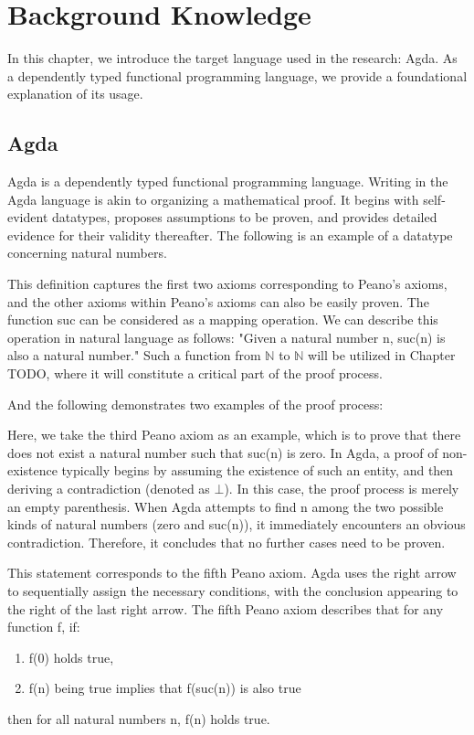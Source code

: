 \chapter{Background Knowledge}
\label{chapter:doccls}

In this chapter, we introduce the target language used in the research: Agda. 
As a dependently typed functional programming language, we provide a foundational explanation of its usage.

\section{Agda}

Agda is a dependently typed functional programming language.
Writing in the Agda language is akin to organizing a mathematical proof. It begins with self-evident datatypes, proposes assumptions to be proven, and provides detailed evidence for their validity thereafter.
The following is an example of a datatype concerning natural numbers.



This definition captures the first two axioms corresponding to Peano's axioms, and the other axioms within Peano's axioms can also be easily proven. 
The function suc can be considered as a mapping operation. 
We can describe this operation in natural language as follows: 
"Given a natural number n, suc(n) is also a natural number." 
Such a function from $\mathbb{N}$ to $\mathbb{N}$ will be utilized in Chapter {TODO}, where it will constitute a critical part of the proof process.

And the following demonstrates two examples of the proof process:



Here, we take the third Peano axiom as an example, which is to prove that there does not exist a natural number such that suc(n) is zero. 
In Agda, a proof of non-existence typically begins by assuming the existence of such an entity, and then deriving a contradiction (denoted as $\bot$). 
In this case, the proof process is merely an empty parenthesis.
When Agda attempts to find n among the two possible kinds of natural numbers (zero and suc(n)), it immediately encounters an obvious contradiction. 
Therefore, it concludes that no further cases need to be proven.


This statement corresponds to the fifth Peano axiom. 
Agda uses the right arrow to sequentially assign the necessary conditions, with the conclusion appearing to the right of the last right arrow. 
The fifth Peano axiom describes that for any function f, if:
\begin{enumerate}[1.]
\item f(0) holds true,
\item f(n) being true implies that f(suc(n)) is also true
\end{enumerate}
then for all natural numbers n, f(n) holds true.

